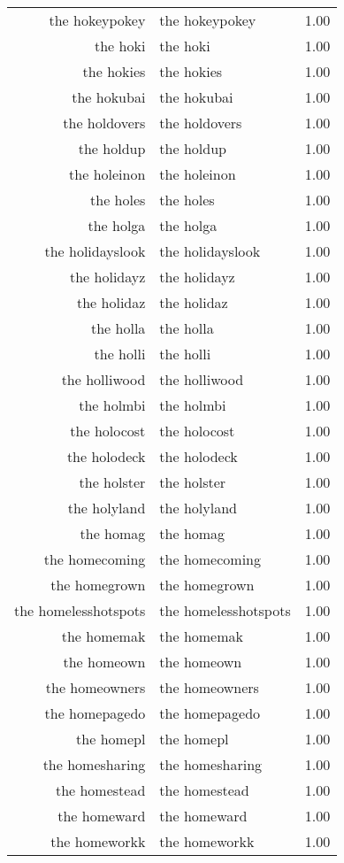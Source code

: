 \begin{table}[ht]
\begin{tabular}{rlr}
  the hokeypokey & the hokeypokey & 1.00 \\ 
  the hoki & the hoki & 1.00 \\ 
  the hokies & the hokies & 1.00 \\ 
  the hokubai & the hokubai & 1.00 \\ 
  the holdovers & the holdovers & 1.00 \\ 
  the holdup & the holdup & 1.00 \\ 
  the holeinon & the holeinon & 1.00 \\ 
  the holes & the holes & 1.00 \\ 
  the holga & the holga & 1.00 \\ 
  the holidayslook & the holidayslook & 1.00 \\ 
  the holidayz & the holidayz & 1.00 \\ 
  the holidaz & the holidaz & 1.00 \\ 
  the holla & the holla & 1.00 \\ 
  the holli & the holli & 1.00 \\ 
  the holliwood & the holliwood & 1.00 \\ 
  the holmbi & the holmbi & 1.00 \\ 
  the holocost & the holocost & 1.00 \\ 
  the holodeck & the holodeck & 1.00 \\ 
  the holster & the holster & 1.00 \\ 
  the holyland & the holyland & 1.00 \\ 
  the homag & the homag & 1.00 \\ 
  the homecoming & the homecoming & 1.00 \\ 
  the homegrown & the homegrown & 1.00 \\ 
  the homelesshotspots & the homelesshotspots & 1.00 \\ 
  the homemak & the homemak & 1.00 \\ 
  the homeown & the homeown & 1.00 \\ 
  the homeowners & the homeowners & 1.00 \\ 
  the homepagedo & the homepagedo & 1.00 \\ 
  the homepl & the homepl & 1.00 \\ 
  the homesharing & the homesharing & 1.00 \\ 
  the homestead & the homestead & 1.00 \\ 
  the homeward & the homeward & 1.00 \\ 
  the homeworkk & the homeworkk & 1.00 \\ 

\end{tabular}
\end{table}
